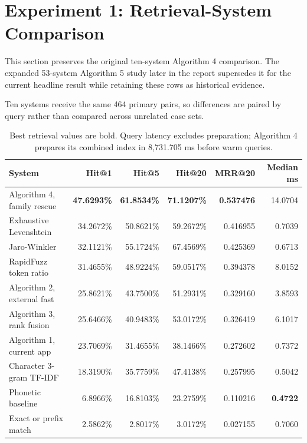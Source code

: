 \documentclass[11pt,a4paper]{article}
\begin{document}
\FloatBarrier
\section{Experiment 1: Retrieval-System Comparison}

This section preserves the original ten-system Algorithm 4 comparison. The
expanded 53-system Algorithm 5 study later in the report supersedes it for the
current headline result while retaining these rows as historical evidence.

Ten systems receive the same 464 primary pairs, so differences are paired by
query rather than compared across unrelated case sets.

\begin{table}[htbp]
\centering
\small
\begin{tabularx}{\linewidth}{@{}Yrrrrr@{}}
\toprule
\textbf{System} & \textbf{Hit@1} & \textbf{Hit@5} & \textbf{Hit@20} &
\textbf{MRR@20} & \textbf{Median ms} \\
\midrule
Algorithm 4, family rescue & \textbf{47.6293\%} & \textbf{61.8534\%} & \textbf{71.1207\%} & \textbf{0.537476} & 14.0704 \\
Exhaustive Levenshtein & 34.2672\% & 50.8621\% & 59.2672\% & 0.416955 & 0.7039 \\
Jaro-Winkler & 32.1121\% & 55.1724\% & 67.4569\% & 0.425369 & 0.6713 \\
RapidFuzz token ratio & 31.4655\% & 48.9224\% & 59.0517\% & 0.394378 & 8.0152 \\
Algorithm 2, external fast & 25.8621\% & 43.7500\% & 51.2931\% & 0.329160 & 3.8593 \\
Algorithm 3, rank fusion & 25.6466\% & 40.9483\% & 53.0172\% & 0.326419 & 6.1017 \\
Algorithm 1, current app & 23.7069\% & 31.4655\% & 38.1466\% & 0.272602 & 0.7372 \\
Character 3-gram TF-IDF & 18.3190\% & 35.7759\% & 47.4138\% & 0.257995 & 0.5042 \\
Phonetic baseline & 6.8966\% & 16.8103\% & 23.2759\% & 0.110216 & \textbf{0.4722} \\
Exact or prefix match & 2.5862\% & 2.8017\% & 3.0172\% & 0.027155 & 0.7060 \\
\bottomrule
\end{tabularx}
\caption{Best retrieval values are bold. Query latency excludes preparation;
Algorithm 4 prepares its combined index in 8,731.705 ms before warm queries.}
\label{tab:retrieval-systems}
\end{table}
\end{document}
